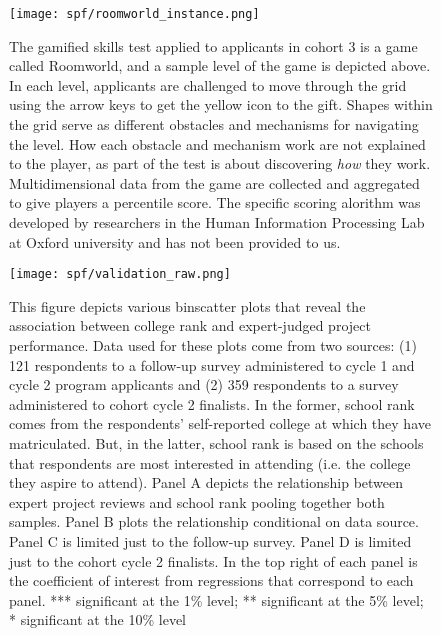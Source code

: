     
    \newpage
    \null
    \vfill
    \begin{figure}[!htb]
    \centering
        \caption{The gamified skills test applied to applicants in cohort 3 is a game called Roomworld, and a sample level of the game is depicted above. In each level, applicants are challenged to move through the grid using the arrow keys to get the yellow icon to the gift. Shapes within the grid serve as different obstacles and mechanisms for navigating the level. How each obstacle and mechanism work are not explained to the player, as part of the test is about discovering \emph{how} they work. Multidimensional data from the game are collected and aggregated to give players a percentile score. The specific scoring alorithm was developed by researchers in the Human Information Processing Lab at Oxford university and has not been provided to us.}\label{fig:roomworld_instance}
    \texttt{[image: spf/roomworld\_instance.png]} 
    \end{figure}
    \vfill
    
    \newpage
    \begin{figure}[!htb]
    \centering
        \caption{This figure depicts various binscatter plots that reveal the association between college rank and expert-judged project performance. Data used for these plots come from two sources: (1) 121 respondents to a follow-up survey administered to cycle 1 and cycle 2 program applicants and (2) 359 respondents to a survey administered to cohort cycle 2 finalists. In the former, school rank comes from the respondents' self-reported college at which they have matriculated. But, in the latter, school rank is based on the schools that respondents are most interested in attending (i.e. the college they aspire to attend). Panel A depicts the relationship between expert project reviews and school rank pooling together both samples. Panel B plots the relationship conditional on data source. Panel C is limited just to the follow-up survey. Panel D is limited just to the cohort cycle 2 finalists. In the top right of each panel is the coefficient of interest from regressions that correspond to each panel. *** significant at the 1\% level; ** significant at the 5\% level; * significant at the 10\% level} \label{fig:proj_robust_1}
    \texttt{[image: spf/validation\_raw.png]} 
    \end{figure}
    
